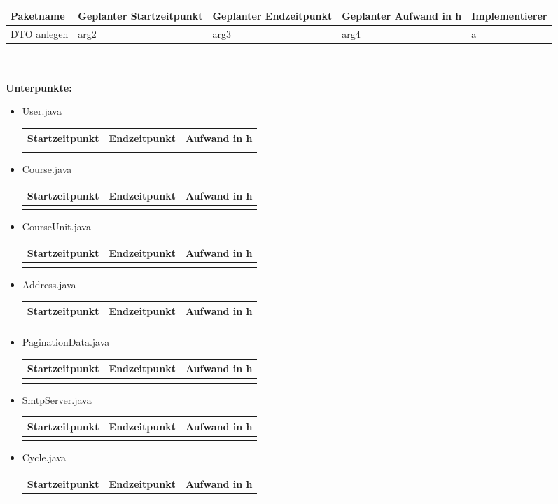 \documentclass[12pt,a4paper]{scrreprt}
\newcommand{\Arbeitspaket}[5]{	\begin{tabular}{|p{4cm}|p{3cm}|p{3cm}|p{3cm}|p{3cm}|}
		\hline \textbf{Paketname} & \textbf{Geplanter Startzeitpunkt} & \textbf{Geplanter Endzeitpunkt} & \textbf{Geplanter Aufwand in h} & \textbf{Implementierer} \\ 
		\hline #1 & #2  & #3 & #4 & #5 \\ 
		\hline 
	\end{tabular} \ \\
	\ \\}
\begin{document}
	\ \\
	\ \\
	\Arbeitspaket{DTO anlegen}{arg2}{arg3}{arg4}{a}
	\textbf{Unterpunkte:}
		\begin{itemize}
			\item User.java\\
			\begin{tabular}{|p{4cm}|p{4cm}|p{4cm}|}
				\hline Startzeitpunkt & Endzeitpunkt & Aufwand in h \\ 
				\hline &      &  \\ 
				\hline 
			\end{tabular}
			\item Course.java\\
			\begin{tabular}{|p{4cm}|p{4cm}|p{4cm}|}
				\hline Startzeitpunkt & Endzeitpunkt & Aufwand in h \\ 
				\hline &      &  \\ 
				\hline 
			\end{tabular}
			\item CourseUnit.java\\
			\begin{tabular}{|p{4cm}|p{4cm}|p{4cm}|}
				\hline Startzeitpunkt & Endzeitpunkt & Aufwand in h \\ 
				\hline &      &  \\ 
				\hline 
			\end{tabular}
			\item Address.java\\
			\begin{tabular}{|p{4cm}|p{4cm}|p{4cm}|}
				\hline Startzeitpunkt & Endzeitpunkt & Aufwand in h \\ 
				\hline &      &  \\ 
				\hline 
			\end{tabular}
			\item PaginationData.java\\
			\begin{tabular}{|p{4cm}|p{4cm}|p{4cm}|}
				\hline Startzeitpunkt & Endzeitpunkt & Aufwand in h \\ 
				\hline &      &  \\ 
				\hline 
			\end{tabular}
			\item SmtpServer.java\\
			\begin{tabular}{|p{4cm}|p{4cm}|p{4cm}|}
				\hline Startzeitpunkt & Endzeitpunkt & Aufwand in h \\ 
				\hline &      &  \\ 
				\hline 
			\end{tabular}
			\item Cycle.java\\
			\begin{tabular}{|p{4cm}|p{4cm}|p{4cm}|}
				\hline Startzeitpunkt & Endzeitpunkt & Aufwand in h \\ 
				\hline &      &  \\ 
				\hline 
			\end{tabular}
		\end{itemize}
\end{document}
